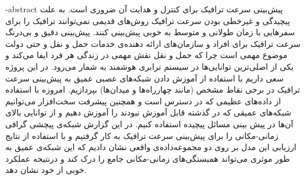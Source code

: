 \department{}

\fa-abstract{
پیش‌بینی سرعت ترافیک برای کنترل و هدایت آن ضروری است.
به علت پیچیدگی و غیرخطی بودن سرعت ترافیک روش‌های قدیمی نمی‌توانند ترافیک را برای سفرهایی با زمان طولانی و متوسط به خوبی پیش‌بینی کنند.
پیش‌بینی دقیق و بی‌درنگ سرعت ترافیک برای افراد و سازمان‌های ارائه دهنده‌ی خدمات حمل و نقل و حتی دولت موضوع مهمی است چرا که حمل و نقل نقش مهمی در زندگی هر فرد ایفا می‌کند و یکی از اصلی‌ترین توانایی‌ها در سیستم ترابری هوشمند  به شمار می‌رود.
در این پروژه سعی داریم با استفاده از آموزش دادن شبکه‌های عصبی عمیق به پیش‌بینی سرعت ترافیک در برخی نقاط مشخص (مانند چهارراه‌ها و میدان‌ها) بپردازیم.
امروزه با استفاده از داده‌های عظیمی که در دسترس است و همچنین پیشرفت سخت‌افزار می‌توانیم شبکه‌های عمیقی که در گذشته قابل آموزش نبودند را آموزش دهیم و از توانایی بالای آن‌ها در پیش بینی مسائل پیچیده استفاده کنیم. در این گزارش شبکه‌ی پیچشی گرافی زمانی-مکانی را برای پیش‌بینی سرعت ترافیک به کار گرفتیم و با استفاده از نتایج ارزیابی این مدل بر روی دو مجموعه‌داده‌ی واقعی نشان دادیم که این شبکه‌ی عمیق به طور موثری می‌تواند همبستگی‌های زمانی-مکانی جامع را درک کند و درنتیجه عملکرد خوبی از خود نشان دهد.
}




\AUTtitle
